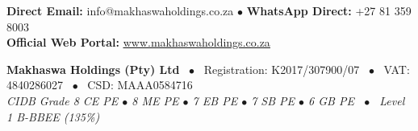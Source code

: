 \documentclass[a4paper,11pt]{article}
\begin{document}
\vspace{0.4cm}

\begin{tcolorbox}[
    enhanced,
    colback=mhnavy2,
    colframe=mhblue,
    boxrule=1pt,
    arc=4pt,
    halign=center,
    left=10pt, right=10pt, top=10pt, bottom=10pt
]
    \color{white}
    \fontsize{8.5pt}{12.5pt}\selectfont
    \textbf{Direct Email:} info@makhaswaholdings.co.za
    \quad $\bullet$ \quad
    \textbf{WhatsApp Direct:} +27 81 359 8003
    \\[0.15cm]
    \textbf{Official Web Portal:} \href{https://www.makhaswaholdings.co.za}{\color{white}\underline{www.makhaswaholdings.co.za}}
\end{tcolorbox}

\vspace{0.8cm}

\begin{center}
    \fontsize{8pt}{11pt}\selectfont\color{white!80}
    \textbf{Makhaswa Holdings (Pty) Ltd} \ $\bullet$ \
    Registration: K2017/307900/07 \ $\bullet$ \
    VAT: 4840286027 \ $\bullet$ \
    CSD: MAAA0584716\\
    \textit{CIDB Grade 8 CE PE $\bullet$ 8 ME PE $\bullet$ 7 EB PE $\bullet$ 7 SB PE $\bullet$ 6 GB PE \ $\bullet$ \ Level 1 B-BBEE (135\%)}
\end{center}

\vspace{0.2cm}
\end{document}
